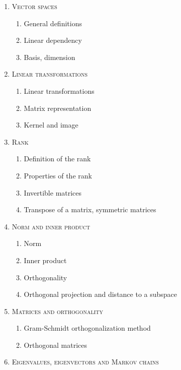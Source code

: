 \begin{enumerate}[label=\textbf{\arabic*.}]
\item \textsc{Vector spaces}
\vspace{-0.2cm}
\begin{enumerate}[label=\arabic*.,noitemsep]
\item General definitions
\item Linear dependency
\item Basis, dimension
\end{enumerate}
\item \textsc{Linear transformations}
\vspace{-0.2cm}
\begin{enumerate}[label=\arabic*.,noitemsep]
\item Linear transformations
\item Matrix representation
\item Kernel and image
\end{enumerate}
\item \textsc{Rank}
\vspace{-0.2cm}
\begin{enumerate}[label=\arabic*.,noitemsep]
\item Definition of the rank
\item Properties of the rank
\item Invertible matrices
\item Transpose of a matrix, symmetric matrices
\end{enumerate}
\item \textsc{Norm and inner product}
\vspace{-0.2cm}
\begin{enumerate}[label=\arabic*.,noitemsep]
\item Norm
\item Inner product
\item Orthogonality
\item Orthogonal projection and distance to a subspace
\end{enumerate}
\item \textsc{Matrices and orthogonality}
\vspace{-0.2cm}
\begin{enumerate}[label=\arabic*.,noitemsep]
\item Gram-Schmidt orthogonalization method
\item Orthogonal matrices
\end{enumerate}
\item \textsc{Eigenvalues, eigenvectors and Markov chains}

\end{enumerate}
